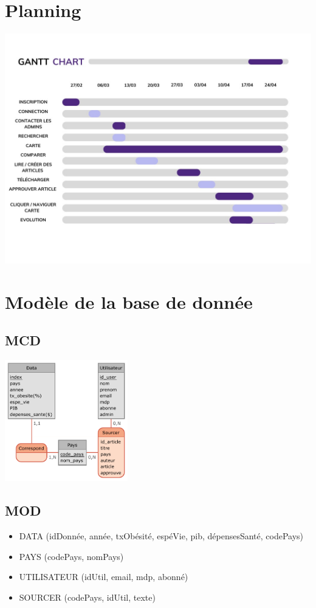 \documentclass[12pt,a4paper]{report}
\begin{document}
\section{Planning}
    \begin{center}
        \includegraphics[width=1\textwidth]{images/gantt.jpg}
    \end{center}

\section{Modèle de la base de donnée}
\subsection{MCD}
    \begin{center}
        \includegraphics[width=0.4\textwidth]{images/Pays-2.pdf}
    \end{center}
\subsection{MOD}
\begin{itemize}
    \item DATA (idDonnée, année, txObésité, espéVie, pib, dépensesSanté, 
    codePays)
    \item PAYS (codePays, nomPays)
    \item UTILISATEUR (idUtil, email, mdp, abonné)
    \item SOURCER (codePays, idUtil, texte)
\end{itemize}
\end{document}
